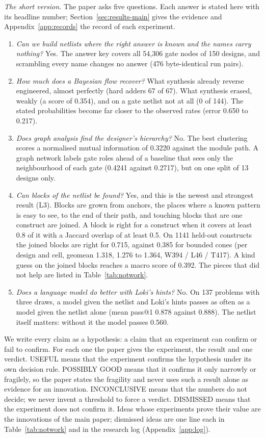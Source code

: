 \documentclass[conference]{IEEEtran}
\begin{document}
\emph{The short version.} The paper asks five questions. Each answer is stated here with its
headline number; Section~\ref{sec:results-main} gives the evidence and Appendix~\ref{app:records}
the record of each experiment.
\begin{enumerate}
\item \emph{Can we build netlists where the right answer is known and the names carry nothing?}
Yes. The answer key covers all 54,306 gate nodes of 150 designs, and scrambling every name changes
no answer (476 byte-identical run pairs).
\item \emph{How much does a Bayesian flow recover?} What synthesis already reverse engineered,
almost perfectly (hard adders 67 of 67). What synthesis erased, weakly (a score of 0.354), and on a gate
netlist not at all (0 of 144). The stated probabilities become far closer to the observed rates (error
0.650 to 0.217).
\item \emph{Does graph analysis find the designer's hierarchy?} No. The best clustering scores a
normalised mutual information of 0.3220 against the module path. A graph network labels gate roles
ahead of a baseline that sees only the neighbourhood of each gate (0.4241 against 0.2717), but on one split of 13 designs only.
\item \emph{Can blocks of the netlist be found?} Yes, and this is the newest and strongest result
(L3). Blocks are grown from anchors, the places where a known pattern is easy to see, to the end of
their path, and touching blocks that are one construct are joined. A block is right for a
construct when it covers at least 0.8 of it with a Jaccard overlap of at least 0.5. On 1141
held-out constructs the joined blocks are right for 0.715, against 0.385 for bounded cones (per
design and cell, geomean 1.318, 1.276 to 1.364, W394 / L46 / T417). A kind guess on the joined blocks
reaches a macro score of 0.392. The pieces that did not help are listed in
Table~\ref{tab:notwork}.
\item \emph{Does a language model do better with Loki's hints?} No. On 137 problems with three
draws, a model given the netlist and Loki's hints passes as often as a model given the netlist
alone (mean pass@1 0.878 against 0.888). The netlist itself matters: without it the model passes
0.560.
\end{enumerate}

We write every claim as a hypothesis: a claim that an experiment can confirm or fail to %
confirm. For each one the paper gives the experiment, the result and one verdict. USEFUL
means that the experiment confirms the hypothesis under its own decision rule. POSSIBLY GOOD
means that it confirms it only narrowly or fragilely, so the paper states the fragility and
never uses such a result alone as evidence for an innovation. INCONCLUSIVE means that the numbers
do not decide; we never invent a threshold to force a verdict. DISMISSED means that the
experiment does not confirm it. Ideas whose experiments prove their value are the innovations of
the main paper; dismissed ideas are one line each in Table~\ref{tab:notwork} and in the research log (Appendix~\ref{app:log}).
\end{document}
